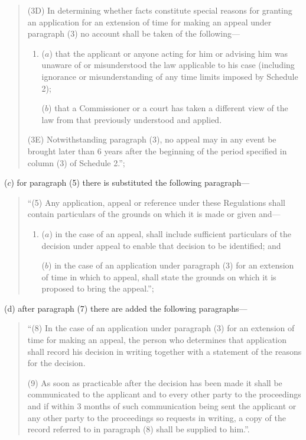 \documentclass[a4paper]{article}
\begin{document}
\begin{enumerate}
\begin{quotation}
(3D) In determining whether facts constitute special reasons for granting an application for an extension of time for making an appeal under paragraph (3) no account shall be taken of the following—
\begin{enumerate}\item[]
($a$) that the applicant or anyone acting for him or advising him was unaware of or misunderstood the law applicable to his case (including ignorance or misunderstanding of any time limits imposed by Schedule 2);

($b$) that a Commissioner or a court has taken a different view of the law from that previously understood and applied.
\end{enumerate}

(3E) Notwithstanding paragraph (3), no appeal may in any event be brought later than 6 years after the beginning of the period specified in column (3) of Schedule 2.”;
\end{quotation}

($c$) for paragraph (5) there is substituted the following paragraph—
\begin{quotation}
“(5) Any application, appeal or reference under these Regulations shall contain particulars of the grounds on which it is made or given and—
\begin{enumerate}\item[]
($a$) in the case of an appeal, shall include sufficient particulars of the decision under appeal to enable that decision to be identified; and

($b$) in the case of an application under paragraph (3) for an extension of time in which to appeal, shall state the grounds on which it is proposed to bring the appeal.”;
\end{enumerate}
\end{quotation}

(d) after paragraph (7) there are added the following paragraphs—
\begin{quotation}
“(8) In the case of an application under paragraph (3) for an extension of time for making an appeal, the person who determines that application shall record his decision in writing together with a statement of the reasons for the decision.

(9) As soon as practicable after the decision has been made it shall be communicated to the applicant and to every other party to the proceedings and if within 3 months of such communication being sent the applicant or any other party to the proceedings so requests in writing, a copy of the record referred to in paragraph (8) shall be supplied to him.”.
\end{quotation}
\end{enumerate}
\end{document}
